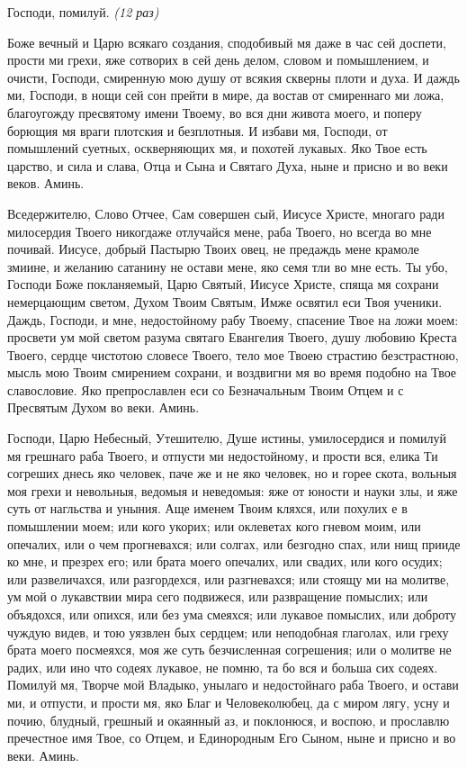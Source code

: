 Господи, помилуй. \itshape (12 раз)\normalfont{}




Боже вечный и Царю всякаго создания, сподобивый мя даже в час сей доспети, прости ми грехи, яже сотворих в сей день делом, словом и помышлением, и очисти, Господи, смиренную мою душу от всякия скверны плоти и духа. И даждь ми, Господи, в нощи сей сон прейти в мире, да востав от смиреннаго ми ложа, благоугожду пресвятому имени Твоему, во вся дни живота моего, и поперу борющия мя враги плотския и безплотныя. И избави мя, Господи, от помышлений суетных, оскверняющих мя, и похотей лукавых. Яко Твое есть царство, и сила и слава, Отца и Сына и Святаго Духа, ныне и присно и во веки веков. Аминь.




Вседержителю, Слово Отчее, Сам совершен сый, Иисусе Христе, многаго ради милосердия Твоего никогдаже отлучайся мене, раба Твоего, но всегда во мне почивай. Иисусе, добрый Пастырю Твоих овец, не предаждь мене крамоле змиине, и желанию сатанину не остави мене, яко семя тли во мне есть. Ты убо, Господи Боже покланяемый, Царю Святый, Иисусе Христе, спяща мя сохрани немерцающим светом, Духом Твоим Святым, Имже освятил еси Твоя ученики. Даждь, Господи, и мне, недостойному рабу Твоему, спасение Твое на ложи моем: просвети ум мой светом разума святаго Евангелия Твоего, душу любовию Креста Твоего, сердце чистотою словесе Твоего, тело мое Твоею страстию безстрастною, мысль мою Твоим смирением сохрани, и воздвигни мя во время подобно на Твое славословие. Яко препрославлен еси со Безначальным Твоим Отцем и с Пресвятым Духом во веки. Аминь.






Господи, Царю Небесный, Утешителю, Душе истины, умилосердися и помилуй мя грешнаго раба Твоего, и отпусти ми недостойному, и прости вся, елика Ти согреших днесь яко человек, паче же и не яко человек, но и горее скота, вольныя моя грехи и невольныя, ведомыя и неведомыя: яже от юности и науки злы, и яже суть от нагльства и уныния. Аще именем Твоим кляхся, или похулих е в помышлении моем; или кого укорих; или оклеветах кого гневом моим, или опечалих, или о чем прогневахся; или солгах, или безгодно спах, или нищ прииде ко мне, и презрех его; или брата моего опечалих, или свадих, или кого осудих; или развеличахся, или разгордехся, или разгневахся; или стоящу ми на молитве, ум мой о лукавствии мира сего подвижеся, или развращение помыслих; или объядохся, или опихся, или без ума смеяхся; или лукавое помыслих, или доброту чуждую видев, и тою уязвлен бых сердцем; или неподобная глаголах, или греху брата моего посмеяхся, моя же суть безчисленная согрешения; или о молитве не радих, или ино что содеях лукавое, не помню, та бо вся и больша сих содеях. Помилуй мя, Творче мой Владыко, унылаго и недостойнаго раба Твоего, и остави ми, и отпусти, и прости мя, яко Благ и Человеколюбец, да с миром лягу, усну и почию, блудный, грешный и окаянный аз, и поклонюся, и воспою, и прославлю пречестное имя Твое, со Отцем, и Единородным Его Сыном, ныне и присно и во веки. Аминь.


